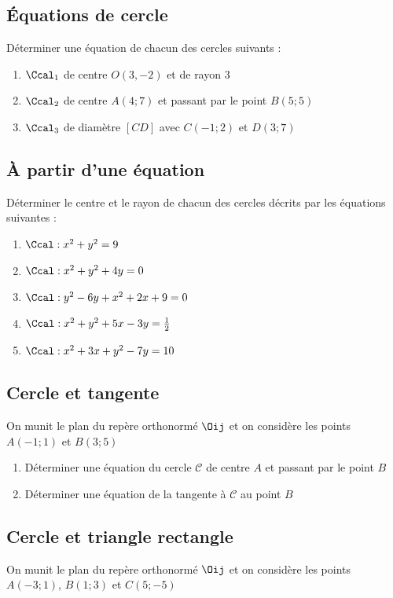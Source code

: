 \documentclass[oneside,12pt]{book}          %
\begin{document}
\subsection{Équations de cercle}
Déterminer une équation de chacun des cercles suivants :
\begin{enumerate}
    \item $\Ccal_1$ de centre $O(3,-2)$ et de rayon 3
    \item $\Ccal_2$ de centre $A(4;7)$ et passant par le point $B(5;5)$
    \item $\Ccal_3$ de diamètre $[CD]$ avec $C(-1;2)$ et $D(3;7)$
\end{enumerate}



\subsection{À partir d'une équation}
Déterminer le centre et le rayon de chacun des cercles décrits par les équations suivantes :
\begin{enumerate}
	\item $\Ccal : x^2+y^2=9$
	\item $\Ccal : x^2+y^2+4y=0$
	\item $\Ccal : y^2-6y+x^2+2x+9=0$
	\item $\Ccal : x^2+y^2+5x-3y=\frac{1}{2}$
	\item $\Ccal : x^2+3x+y^2-7y=10$
\end{enumerate}



\subsection{Cercle et tangente}
On munit le plan du repère orthonormé $\Oij$ et on considère les points $A(-1;1)$ et $B(3;5)$
\begin{enumerate}
    \item Déterminer une équation du cercle $\mathscr{C}$ de centre $A$ et passant par le point $B$
    \item Déterminer une équation de la tangente à $\mathscr{C}$ au point $B$
\end{enumerate}



\subsection{Cercle et triangle rectangle}
On munit le plan du repère orthonormé $\Oij$ et on considère les points $A(-3;1)$, $B(1;3)$ et $C(5;-5)$
\end{document}
